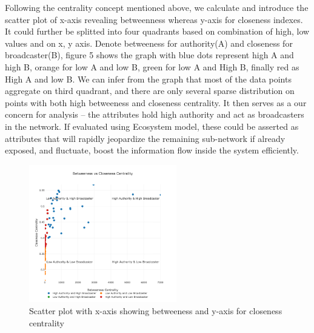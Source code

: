 \documentclass[letterpaper, 10 pt, conference]{ieeeconf}  %
\begin{document}
Following the centrality concept mentioned above, we calculate and introduce the scatter plot of x-axis revealing betweenness whereas y-axis for closeness indexes.  It could further be splitted into four quadrants based on combination of high, low values and on x, y axis. Denote betweeness for authority(A) and closeness for broadcaster(B), figure 5 shows the graph with blue dots represent high A and high B, orange for low A and low B, green for low A and High B, finally red as High A and low B. We can infer from the graph that most of the data points aggregate on third quadrant, and there are only several sparse distribution on points with both high betweeness and closeness centrality. It then serves as a our concern for analysis -- the attributes hold high authority and act as broadcasters in the network. If evaluated using Ecosystem model, these could be asserted as attributes that will rapidly jeopardize the remaining sub-network if already exposed, and fluctuate, boost the information flow inside the system efficiently.

\begin{figure}[h!]
  \includegraphics[width=\linewidth, height=6cm]{scatterplot.png}
  \caption{Scatter plot with x-axis showing betweeness and y-axis for closeness centrality}
  \label{fig:pic2}
\end{figure}
\end{document}
